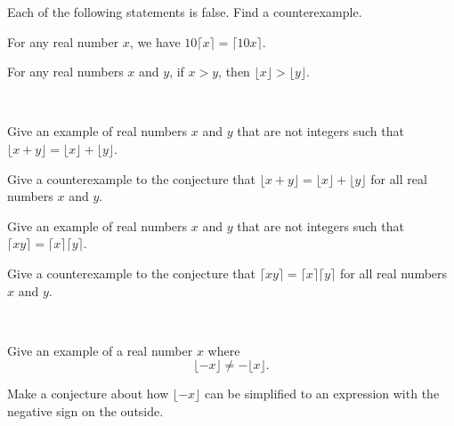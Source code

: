 \begin{exer}[\exerU] %
\label{exer_floor_cex}
    Each of the following statements is false. Find a counterexample.
        \begin{exerpart}
            \item For any real number $x$, we have $10 \lceil x \rceil = \lceil 10x \rceil .$
            \item  For any real numbers $x$ and $y$, if $x > y$, then $\lfloor x \rfloor > \lfloor y \rfloor$.  
        \end{exerpart}
\end{exer}

\begin{exer}[\exerU] %
\label{exer_floor_sum_ceiling_product}   
~
    \begin{exerpart}
        \item Give an example of real numbers $x$ and $y$ that are not integers such that $\lfloor x +y \rfloor = \lfloor x \rfloor + \lfloor y \rfloor.$

        \item Give a counterexample to the conjecture that $\lfloor x +y \rfloor = \lfloor x \rfloor + \lfloor y \rfloor$ for all real numbers $x$ and $y$.

        \item Give an example of real numbers $x$ and $y$ that are not integers such that $\lceil xy \rceil = \lceil x \rceil \lceil y \rceil.$

         \item Give a counterexample to the conjecture that $\lceil xy \rceil = \lceil x \rceil \lceil y \rceil$ for all real numbers $x$ and $y$.
    \end{exerpart}
\end{exer}

\begin{exer}[\exerU] %
\label{exer_floor_negative}
~
    \begin{exerpart}
        \item Give an example of a real number $x$ where $$\lfloor -x \rfloor \neq -\lfloor x \rfloor.$$
        \item Make a conjecture about how $\lfloor -x \rfloor$ can be simplified to an expression with the negative sign on the outside. 
    \end{exerpart}
\end{exer}

